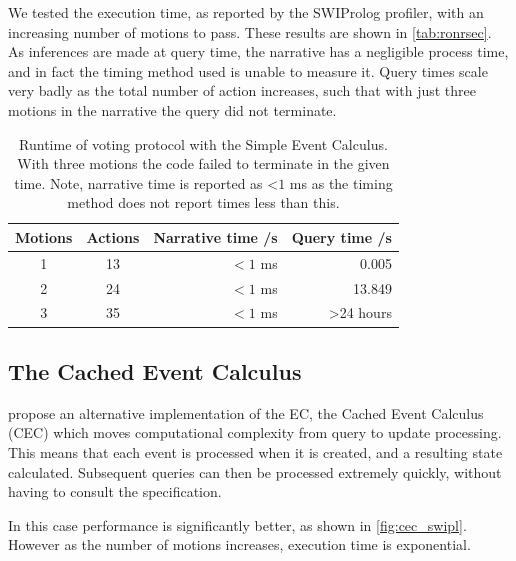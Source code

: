 We tested the execution time, as reported by the SWIProlog profiler, with
an increasing number of motions to pass. These results are shown in \autoref{tab:ronrsec}.
As inferences are made at query time, the narrative has a negligible process
time, and in fact the timing method used is unable to measure it. Query times scale very badly as the total number of action increases, such
that with just three motions in the narrative the query did not terminate.

\begin{table}
\caption[Runtime of voting protocol with the Simple Event Calculus]{Runtime of voting protocol with the Simple Event Calculus. With three motions the
code failed to terminate in the given time. Note, narrative time is reported as <$1$ ms as the timing method does not report times less than this.}\label{tab:ronrsec}
\centering
\begin{tabular}{c|c|r|r}
Motions & Actions & Narrative time /s & Query time /s \\ \hline
1 & 13 & $<1$ ms & 0.005 \\
2 & 24 & $<1$ ms & 13.849 \\
3 & 35 & $<1$ ms & >24 hours \\
\end{tabular}
\end{table}

\subsection{The Cached Event Calculus}

\citet{Chittaro1996} propose an alternative implementation of the \ac{EC}, the
Cached Event Calculus (CEC) which
moves computational complexity from query to update processing. This means that
each event is processed when it is created, and a resulting state calculated.
Subsequent queries can then be processed extremely quickly, without having to
consult the specification.



In this case performance is significantly better, as shown in
\autoref{fig:cec_swipl}. However as the number of motions increases, execution
time is exponential.

